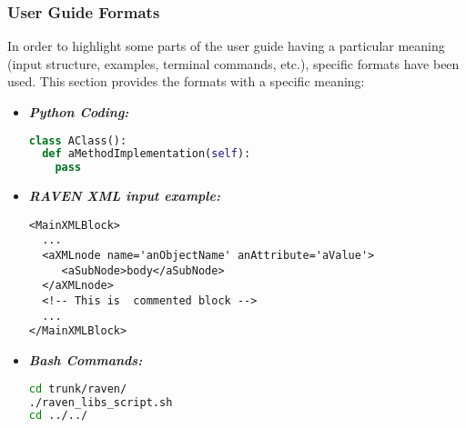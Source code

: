 \subsubsection{User Guide Formats}
In order to highlight some parts of the user guide having a particular meaning (input structure, examples, terminal commands, etc.), specific formats have been used. This section provides the formats with a specific meaning:
\begin{itemize}
\item \textbf{\textit{Python Coding:}}
\begin{lstlisting}[language=python]
class AClass():
  def aMethodImplementation(self):
    pass
\end{lstlisting}
\item \textbf{\textit{RAVEN XML input example:}}
\begin{lstlisting}[style=XML,morekeywords={anAttribute}]
<MainXMLBlock>
  ...
  <aXMLnode name='anObjectName' anAttribute='aValue'>
     <aSubNode>body</aSubNode>
  </aXMLnode>
  <!-- This is  commented block -->
  ...
</MainXMLBlock>
\end{lstlisting}
\item \textbf{\textit{Bash Commands:}}
\begin{lstlisting}[language=bash]
cd trunk/raven/
./raven_libs_script.sh
cd ../../
\end{lstlisting}
\end{itemize}

